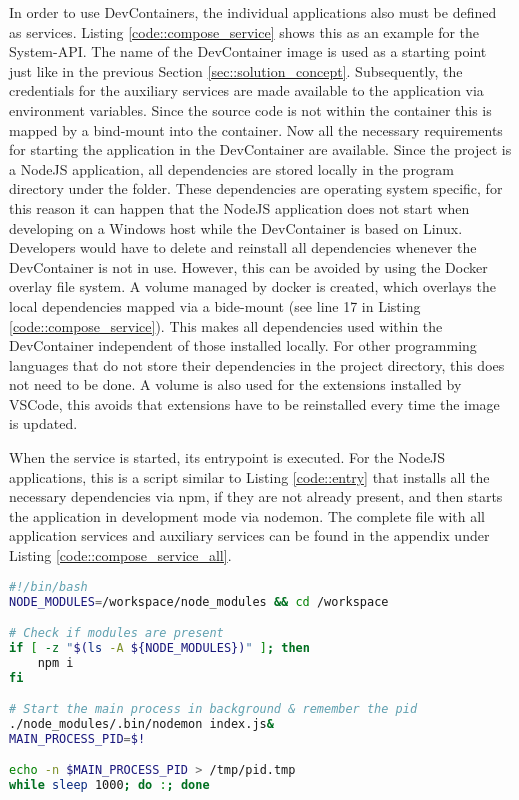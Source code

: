         In order to use DevContainers, the individual applications also must be defined as services. Listing \ref{code::compose_service} shows this as an example for the System-\ac{API}. The name of the DevContainer image is used as a starting point just like in the previous Section \ref{sec::solution_concept}. Subsequently, the credentials for the auxiliary services are made available to the application via environment variables. Since the source code is not within the container this is mapped by a bind-mount into the container. Now all the necessary requirements for starting the application in the DevContainer are available.\newline
        Since the project is a NodeJS application, all dependencies are stored locally in the program directory under the  folder. These dependencies are operating system specific, for this reason it can happen that the NodeJS application does not start when developing on a Windows host while the DevContainer is based on Linux. Developers would have to delete and reinstall all dependencies whenever the DevContainer is not in use. However, this can be avoided by using the Docker overlay file system. A volume managed by docker is created, which overlays the local dependencies mapped via a bide-mount (see line 17 in Listing \ref{code::compose_service}). This makes all dependencies used within  the DevContainer independent of those installed locally. For other programming languages that do not store their dependencies in the project directory, this does not need to be done. A volume is also used for the extensions installed by VSCode, this avoids that extensions have to be reinstalled every time the image is updated.\newline
        
        When the service is started, its entrypoint is executed. For the NodeJS applications, this is a script similar to Listing \ref{code::entry} that installs all the necessary dependencies via npm, if they are not already present, and then starts the application in development mode via nodemon. The complete  file with all application services and auxiliary services can be found in the appendix under Listing \ref{code::compose_service_all}.
    \begin{lstlisting}[language=bash,caption={DevContainer \code{entryscript.sh}},breaklines=true,label={code::entry}]
#!/bin/bash
NODE_MODULES=/workspace/node_modules && cd /workspace

# Check if modules are present
if [ -z "$(ls -A ${NODE_MODULES})" ]; then
    npm i
fi

# Start the main process in background & remember the pid
./node_modules/.bin/nodemon index.js&
MAIN_PROCESS_PID=$!

echo -n $MAIN_PROCESS_PID > /tmp/pid.tmp
while sleep 1000; do :; done
        \end{lstlisting}
